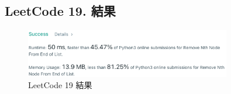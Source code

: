 \documentclass[10pt,UTF8]{ctexart}
\begin{document}
\subsection{LeetCode 19. 結果}

\begin{figure}[H]
\centering 
\includegraphics[width=0.80\textwidth]{lc-19-o.png} 
\caption{LeetCode 19 結果}
\label{Test}
\end{figure}











\clearpage
\end{document}

